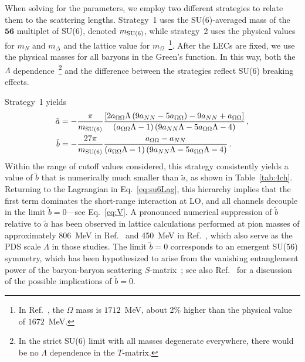 \documentclass[prl,showpacs,twocolumn,superscriptaddress,floatfix,10pt,footinbib]{revtex4-2}
\begin{document}
When solving for the parameters, we employ two different strategies to relate them to the scattering lengths. Strategy~1 uses the SU(6)-averaged mass of the $\bm{56}$ multiplet of SU(6), denoted $m_{\rm SU(6)}$, while strategy~2 uses the physical values for $m_N$ and $m_\Delta$ and the lattice value for $m_\Omega$~\footnote{In Ref.~\cite{Gongyo:2017fjb}, the $\Omega$ mass is $1712$~MeV, about 2\% higher than the physical value of $1672$~MeV.}. After the LECs are fixed, we use the physical masses for all baryons in the Green's function. In this way, both the $\Lambda$ dependence~\footnote{In the strict SU(6) limit with all masses degenerate everywhere, there would be no $\Lambda$ dependence in the $T$-matrix.} and the difference between the strategies reflect SU(6) breaking effects.

Strategy~1 yields~\cite{Richardson:2024zln}
\begin{align}
\tilde{a}&=-\frac{\pi}{m_{\rm SU(6)}}\frac{\left[ 2a_{\Omega \Omega}\Lambda \left( 9a_{NN}-5a_{\Omega \Omega} \right) -9a_{NN}+a_{\Omega \Omega} \right]}{\left( a_{\Omega \Omega}\Lambda -1 \right) \left( 9a_{NN}\Lambda -5a_{\Omega \Omega}\Lambda -4 \right)}\,, \notag\\
\tilde{b}&=-\frac{27\pi}{m_{\rm SU(6)}}\frac{a_{\Omega \Omega}-a_{NN}}{\left( a_{\Omega \Omega}\Lambda -1 \right) \left( 9a_{NN}\Lambda -5a_{\Omega \Omega}\Lambda -4 \right)}\,.
\end{align}
Within the range of cutoff values considered, this strategy consistently yields a value of $\tilde b$ that is numerically much smaller than $\tilde a$, as shown in Table~\ref{tab:4ch}. Returning to the Lagrangian in Eq.~\eqref{eq:su6Lag}, this hierarchy implies that the first term dominates the short-range interaction at LO, and all channels decouple in the limit $\tilde b=0$---see Eq.~\eqref{eq:V}. A pronounced numerical suppression of $\tilde b$ relative to $\tilde a$ has been observed in lattice calculations performed at pion masses of approximately 806~MeV in Ref.~\cite{Wagman:2017tmp} and 450~MeV in Ref.~\cite{NPLQCD:2020lxg}, which also serve as the PDS scale $\Lambda$ in those studies. The limit $\tilde{b} = 0$ corresponds to an emergent SU(56) symmetry, which has been hypothesized to arise from the vanishing entanglement power of the baryon-baryon scattering $S$-matrix~\cite{Beane:2018oxh, Liu:2022grf, Hu:2025lua}; see also Ref.~\cite{Richardson:2024zln} for a discussion of the possible implications of $\tilde{b} = 0$.
\end{document}
